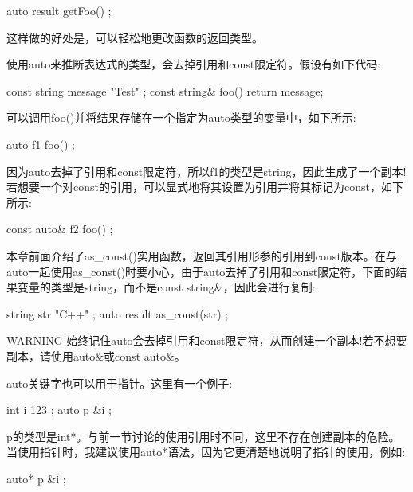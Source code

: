 \begin{cpp}
auto result { getFoo() };
\end{cpp}

这样做的好处是，可以轻松地更改函数的返回类型。


使用auto来推断表达式的类型，会去掉引用和const限定符。假设有如下代码:

\begin{cpp}
const string message { "Test" };
const string& foo() { return message; }
\end{cpp}

可以调用foo()并将结果存储在一个指定为auto类型的变量中，如下所示:

\begin{cpp}
auto f1 { foo() };
\end{cpp}

因为auto去掉了引用和const限定符，所以f1的类型是string，因此生成了一个副本!若想要一个对const的引用，可以显式地将其设置为引用并将其标记为const，如下所示:

\begin{cpp}
const auto& f2 { foo() };
\end{cpp}

本章前面介绍了as\_const()实用函数，返回其引用形参的引用到const版本。在与auto一起使用as\_const()时要小心，由于auto去掉了引用和const限定符，下面的结果变量的类型是string，而不是const string\&，因此会进行复制:

\begin{cpp}
string str { "C++" };
auto result { as_const(str) };
\end{cpp}

\begin{myWarning}{WARNING}
始终记住auto会去掉引用和const限定符，从而创建一个副本!若不想要副本，请使用auto\&或const auto\&。
\end{myWarning}


auto关键字也可以用于指针。这里有一个例子:

\begin{cpp}
int i { 123 };
auto p { &i };
\end{cpp}

p的类型是int*。与前一节讨论的使用引用时不同，这里不存在创建副本的危险。当使用指针时，我建议使用auto*语法，因为它更清楚地说明了指针的使用，例如:

\begin{cpp}
auto* p { &i };
\end{cpp}

